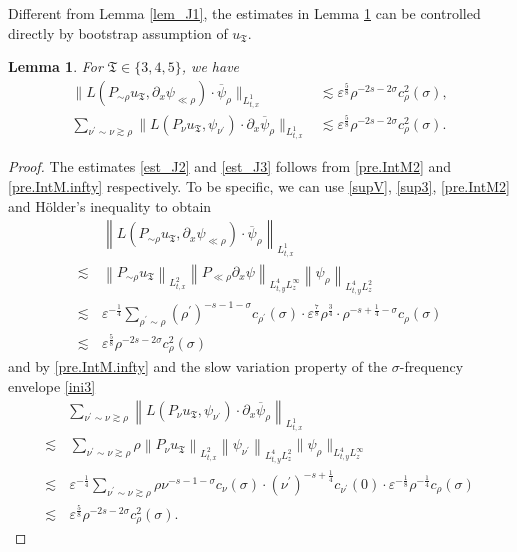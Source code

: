 \documentclass[11pt,letterpaper,reqno]{amsart}
\numberwithin{equation}{section}
\newtheorem{lemma}[theorem]{Lemma}
\theoremstyle{definition}
\theoremstyle{remark}
\begin{document}
    Different from Lemma \ref{lem_J1}, the estimates in Lemma \ref{lem_J2} can be controlled directly by   
bootstrap assumption of \(u_{\mathfrak{T}}\).
\begin{lemma} \label{lem_J2}
For $\mathfrak{T}\in\{3,4,5\}  $, we have
	\begin{align}
		   \| L( P_{\sim \rho}  u_{\mathfrak{T}} ,  \partial_x   \psi_{\ll \rho } ) \cdot  \overline{\psi}_{\rho}   \|_{L^1_{t,x}}& \lesssim \varepsilon^{\frac58} \rho ^{-2s-2\sigma}c^2_\rho(\sigma),  \label{est_J2} \\
				\sum_{\nu^{\prime} \sim \nu \gtrsim \rho }  \| L(P_{\nu}  u_{\mathfrak{T}},   \psi_{\nu^\prime } ) \cdot \partial_x  \overline{\psi}_{\rho}   \|_{L^1_{t,x}} &\lesssim \varepsilon^{\frac58}\rho ^{-2s-2\sigma}c^2_\rho(\sigma).  \label{est_J3}
	\end{align}
\end{lemma}
\begin{proof}  The estimates  \eqref{est_J2} and  \eqref{est_J3}  follows from \eqref{pre.IntM2} and \eqref{pre.IntM.infty} respectively.  To be specific, we can use  \eqref{supV}, \eqref{sup3}, \eqref{pre.IntM2} and H\"older's inequality   to obtain
	\begin{align*}
		&\,    \left\| L( P_{\sim \rho}  u_{\mathfrak{T}} , \partial_x     \psi_{\ll \rho } ) \cdot   \overline{\psi}_{\rho}  \right\|_{L^1_{t,x}}\\
		\lesssim&\,      \left\| P_{\sim \rho}  u_{\mathfrak{T}}  \right\|_{L^2_{t,x}}\left\|    P_{\ll \rho } \partial_x  \psi \right\|_{L^4_{t,y}L^\infty_z} \left\|    \psi_{\rho}  \right\|_{L^4_{t,y}L^2_z} \\
		\lesssim &\,\varepsilon^{-\frac 14}  \sum_{\rho^\prime \sim  \rho}   (\rho^\prime)^{-s-1-\sigma} c_{\rho^\prime} (\sigma)\cdot \varepsilon^{\frac78}   \rho^{ \frac 34}\cdot\rho^{-s+\frac 14-\sigma} c_\rho (\sigma)\\
		\lesssim &\, \varepsilon^{\frac58}\rho ^{-2s-2\sigma}c^2_\rho(\sigma)
	\end{align*}
and by \eqref{pre.IntM.infty} and the   slow variation property of the $\sigma$-frequency envelope \eqref{ini3}
\begin{align*}
&\sum_{\nu^{\prime} \sim \nu \gtrsim \rho } \left\| L(P_{\nu}  u_{\mathfrak{T}}, \psi_{\nu^\prime } ) \cdot \partial_x  \overline{\psi}_{\rho}  \right\|_{L^1_{t,x}} \\
	 \lesssim&\, \sum_{\nu^{\prime} \sim \nu \gtrsim \rho } \rho \left\| P_{\nu}  u_{\mathfrak{T}}  \right\|_{L^2_{t,x}}\left\|   \psi_{\nu^\prime }  \right\|_{L^4_{t,y}L^2_z}  \|   \psi_{\rho}\|_{L^4_{t,y}L^\infty_z}\\
\lesssim &\,\varepsilon^{-\frac 14} \sum_{\nu^{\prime} \sim \nu \gtrsim \rho } \rho   \nu^{-s-1-\sigma} c_\nu (\sigma) \cdot(\nu^\prime)^{-s+\frac 14} c_{\nu^\prime}(0)  \cdot  \varepsilon^{-\frac18}  \rho^{-\frac 14} c_\rho (\sigma)\\
\lesssim &\, \varepsilon^{\frac58}\rho ^{-2s-2\sigma}c^2_\rho(\sigma).
\end{align*} 
	\end{proof}
\end{document}
